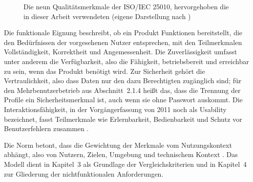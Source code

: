 \documentclass[12pt,a4paper]{scrreprt}
\begin{document}
\begin{figure}[!htb]
    \centering
    \caption{Die neun Qualitätsmerkmale der ISO/IEC 25010, hervorgehoben die in dieser Arbeit verwendeten (eigene Darstellung nach \cite[Abschn.~4.1]{iso25010})}
    \label{fig:iso25010}
\end{figure}

Die funktionale Eignung beschreibt, ob ein Produkt Funktionen bereitstellt, die den Bedürfnissen der vorgesehenen Nutzer entsprechen, mit den Teilmerkmalen Vollständigkeit, Korrektheit und Angemessenheit. Die Zuverlässigkeit umfasst unter anderem die Verfügbarkeit, also die Fähigkeit, betriebsbereit und erreichbar zu sein, wenn das Produkt benötigt wird. Zur Sicherheit gehört die Vertraulichkeit, also dass Daten nur den dazu Berechtigten zugänglich sind; für den Mehrbenutzerbetrieb aus Abschnitt~2.1.4 heißt das, dass die Trennung der Profile ein Sicherheitsmerkmal ist, auch wenn sie ohne Passwort auskommt. Die Interaktionsfähigkeit, in der Vorgängerfassung von 2011 noch als Usability bezeichnet, fasst Teilmerkmale wie Erlernbarkeit, Bedienbarkeit und Schutz vor Benutzerfehlern zusammen \cite[Abschn.~3]{iso25010}.

Die Norm betont, dass die Gewichtung der Merkmale vom Nutzungskontext abhängt, also von Nutzern, Zielen, Umgebung und technischem Kontext \cite[Abschn.~4.2]{iso25010}. Das Modell dient in Kapitel~3 als Grundlage der Vergleichskriterien und in Kapitel~4 zur Gliederung der nichtfunktionalen Anforderungen.
\end{document}
